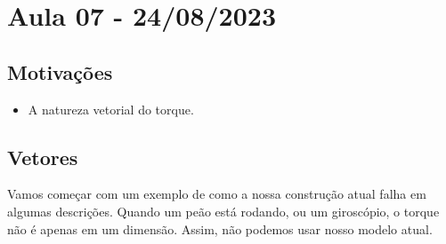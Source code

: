 \documentclass[physicsII_notes.tex]{subfiles}
\begin{document}
\section{Aula 07 - 24/08/2023}
\subsection{Motivações}
\begin{itemize}
	\item A natureza vetorial do torque.
\end{itemize}
\subsection{Vetores}
Vamos começar com um exemplo de como a nossa construção atual falha em algumas descrições.
Quando um peão está rodando, ou um giroscópio, o torque não é apenas em um dimensão. Assim, não podemos usar nosso modelo atual.
\end{document}
